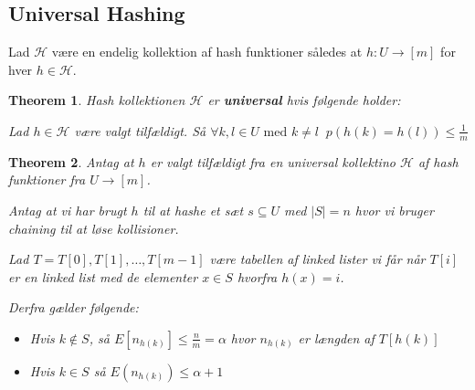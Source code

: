 \documentclass[11pt]{article}
\newtheorem{theorem}{Theorem}
\theoremstyle{definition}
\theoremstyle{remark}
\begin{document}
\subsection{Universal Hashing}

Lad $\mathcal{H}$ være en endelig kollektion af hash funktioner således at $h : U \rightarrow [m]$  for hver $h \in \mathcal{H}$.

\begin{theorem}
  Hash kollektionen $\mathcal{H}$ er \textbf{universal} hvis følgende holder:

  Lad $h \in \mathcal{H}$ være valgt tilfældigt. Så $\forall k, l \in U \text{ med } k \neq l \; \; p(h(k) = h(l)) \leq \frac{1}{m}$
  \end{theorem}

\begin{theorem}
  Antag at $h$ er valgt tilfældigt fra en universal kollektino $\mathcal{H}$ af hash funktioner fra $U \rightarrow [m]$.

  Antag at vi har brugt $h$ til at hashe et sæt $s \subseteq U$ med $|S| = n$ hvor vi bruger chaining til at løse kollisioner.

  Lad $T = T[0], T[1], \ldots, T[m-1]$ være tabellen af linked lister vi får når $T[i]$ er en linked list med de elementer $x \in S$ hvorfra $h(x) = i$.

  Derfra gælder følgende:
  \begin{itemize}
  \item Hvis $k \notin S$, så $E[n_{h(k)}] \leq \frac{n}{m} = \alpha$ hvor $n_{h(k)}$ er længden af $T[h(k)]$
  \item Hvis $k \in S$ så $E(n_{h(k)}) \leq \alpha + 1$
    \end{itemize}
 \end{theorem}
\end{document}
